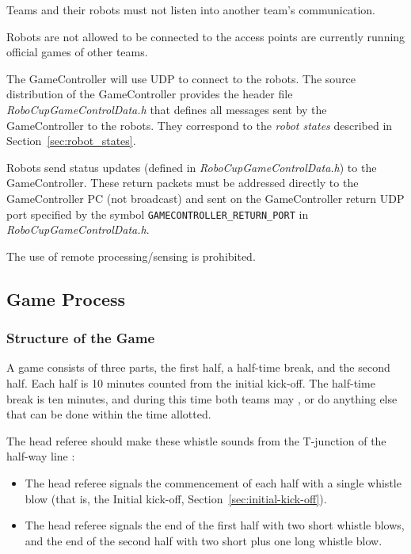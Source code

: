 Teams and their robots must not listen into another team's communication.

Robots are not allowed to be connected to the access points  are currently running official games of other teams.

The GameController will use UDP to connect to the robots. The source distribution of the GameController provides the header file \emph{RoboCupGameControlData.h} that defines all messages sent by the GameController to the robots. They correspond to the \emph{robot states} described in Section~\ref{sec:robot_states}.

Robots send status updates (defined in \emph{RoboCupGameControlData.h}) to the GameController. These return packets must be addressed directly to the GameController PC (\ie not broadcast) and sent on the GameController return UDP port specified by the symbol \verb!GAMECONTROLLER_RETURN_PORT! in \emph{RoboCupGameControlData.h}.

The use of remote processing/sensing is prohibited.

\subsection{Game Process}
\label{sec:game_process}

\subsubsection{Structure of the Game}
\label{sec:game_struct}

A game consists of three parts, the first half, a half-time break, and the second half. Each half is 10 minutes counted from the initial kick-off.
The half-time break is ten minutes, and during this time both teams may , or do anything else that can be done within the time allotted. 

The head referee should make these whistle sounds from the T-junction of the half-way line :
\begin{itemize}
\item The head referee signals the commencement of each half with a single whistle blow (that is, the Initial kick-off, \cf Section~\ref{sec:initial-kick-off}).
\item The head referee signals the end of the first half with two short whistle blows, and the end of the second half with two short plus one long whistle blow.
\end{itemize}

